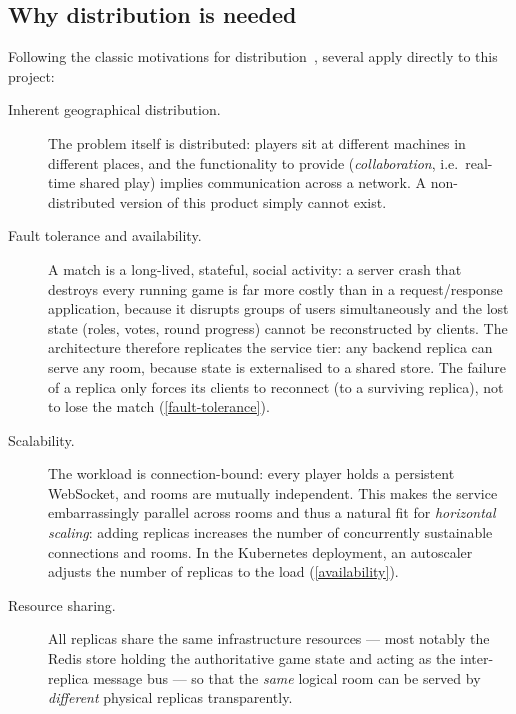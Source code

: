 \documentclass{scrartcl}
\begin{document}
\subsection{Why distribution is needed}

Following the classic motivations for distribution~\cite{ghosh2014distributed,
tanenbaum2017distributed}, several apply directly to this project:

\begin{description}
  \item[Inherent geographical distribution.] The problem itself is
  distributed: players sit at different machines in different places, and
  the functionality to provide (\emph{collaboration}, i.e.\ real-time shared
  play) implies communication across a network. A non-distributed version
  of this product simply cannot exist.

  \item[Fault tolerance and availability.] A match is a long-lived,
  stateful, social activity: a server crash that destroys every running
  game is far more costly than in a request/response application, because
  it disrupts groups of users simultaneously and the lost state (roles,
  votes, round progress) cannot be reconstructed by clients. The
  architecture therefore replicates the service tier: any backend replica
  can serve any room, because state is externalised to a shared store.
  The failure of a replica only forces its clients to reconnect (to a
  surviving replica), not to lose the match (\cref{fault-tolerance}).

  \item[Scalability.] The workload is connection-bound: every player holds
  a persistent WebSocket, and rooms are mutually independent. This makes
  the service embarrassingly parallel across rooms and thus a natural fit
  for \emph{horizontal scaling}: adding replicas increases the number of
  concurrently sustainable connections and rooms. In the Kubernetes
  deployment, an autoscaler adjusts the number of replicas to the load
  (\cref{availability}).

  \item[Resource sharing.] All replicas share the same infrastructure
  resources --- most notably the Redis store holding the authoritative game
  state and acting as the inter-replica message bus --- so that the
  \emph{same} logical room can be served by \emph{different} physical
  replicas transparently.
\end{description}
\end{document}

